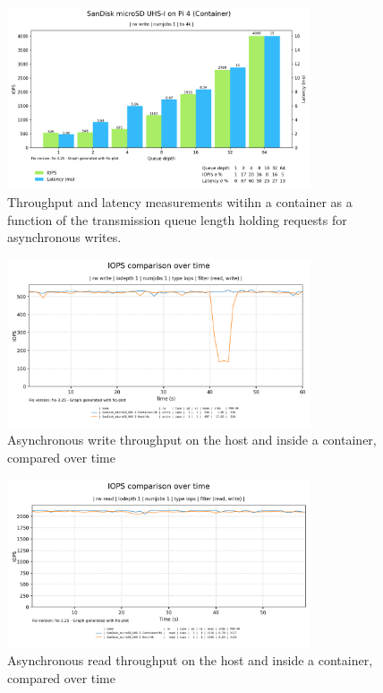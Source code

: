 \begin{figure}[H]
    \centering
    \includegraphics[width=0.8\textwidth]{images/results/sandisk-libaio-write-queue-depth-iops-latency.png}
    \caption{Throughput and latency measurements witihn a container as a function of the transmission queue length holding requests for asynchronous writes.}
    \label{images:fundamentals/net-ns-veth-arch.jpg}
\end{figure}

\begin{figure}[H]
    \centering
    \includegraphics[width=0.8\textwidth]{images/results/sandisk-libaio-iops-write-comparison.png}
    \caption{Asynchronous write throughput on the host and inside a container, compared over time}
    \label{images:fundamentals/net-ns-veth-arch.jpg}
\end{figure}

\begin{figure}[H]
    \centering
    \includegraphics[width=0.8\textwidth]{images/results/sandisk-libaio-iops-read-comparison.png}
    \caption{Asynchronous read throughput on the host and inside a container, compared over time}
    \label{images:fundamentals/net-ns-veth-arch.jpg}
\end{figure}

